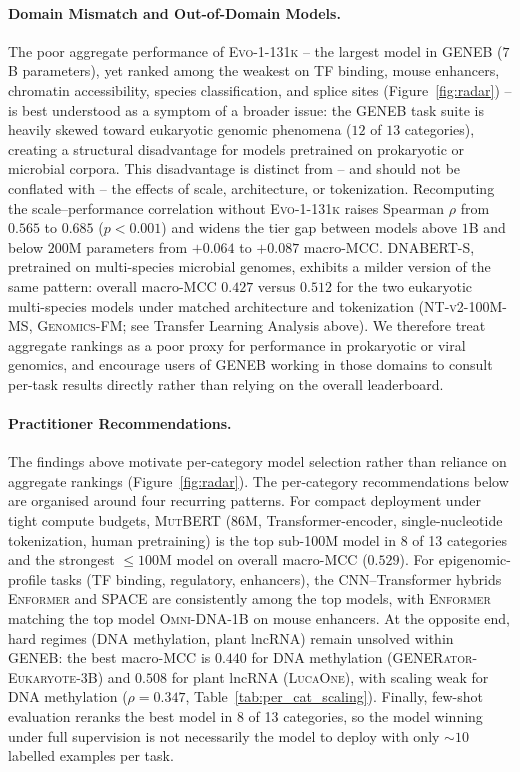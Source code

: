 \documentclass{article}
\theoremstyle{plain}
\theoremstyle{definition}
\theoremstyle{remark}
\begin{document}
\paragraph{Domain Mismatch and Out-of-Domain Models.}
The poor aggregate performance of \textsc{Evo-1-131k} -- the largest
model in GENEB ($7$B parameters), yet ranked among the weakest on TF binding, mouse enhancers,
chromatin accessibility, species classification, and splice sites
(Figure~\ref{fig:radar}) -- is best understood as a symptom of a broader issue: the GENEB task suite is heavily skewed toward eukaryotic genomic phenomena
($12$ of $13$ categories), creating a structural disadvantage for
models pretrained on prokaryotic or microbial corpora. This disadvantage is distinct from -- and should
not be conflated with -- the effects of scale, architecture, or
tokenization. Recomputing the scale--performance correlation without \textsc{Evo-1-131k}
raises Spearman $\rho$ from $0.565$ to $0.685$ ($p<0.001$) and widens
the tier gap between models above $1$B and below $200$M parameters
from $+0.064$ to $+0.087$ macro-MCC.
\textsc{DNABERT-S}, pretrained on multi-species microbial genomes,
exhibits a milder version of the same pattern: overall macro-MCC
$0.427$ versus $0.512$ for the two eukaryotic multi-species models
under matched architecture and tokenization
(\textsc{NT-v2-100M-MS}, \textsc{Genomics-FM}; see Transfer Learning
Analysis above). We therefore treat aggregate rankings as a poor
proxy for performance in prokaryotic or viral genomics, and
encourage users of GENEB working in those domains to consult
per-task results directly rather than relying on the overall
leaderboard.

\paragraph{Practitioner Recommendations.}
The findings above motivate per-category model selection rather than
reliance on aggregate rankings (Figure~\ref{fig:radar}). The
per-category recommendations below are organised around four
recurring patterns. For compact deployment under tight compute
budgets, \textsc{MutBERT} (86M, Transformer-encoder, single-nucleotide
tokenization, human pretraining) is the top sub-100M model in 8 of 13
categories and the strongest $\le 100$M model on overall macro-MCC
($0.529$). For epigenomic-profile tasks (TF binding, regulatory,
enhancers), the CNN--Transformer hybrids \textsc{Enformer} and
\textsc{SPACE} are consistently among the top models, with
\textsc{Enformer} matching the top model \textsc{Omni-DNA-1B}
on mouse enhancers. At the opposite end, hard
regimes (DNA methylation, plant lncRNA) remain unsolved within GENEB:
the best macro-MCC is $0.440$ for DNA methylation
(\textsc{GENERator-Eukaryote-3B}) and $0.508$ for plant lncRNA
(\textsc{LucaOne}), with scaling weak for DNA methylation ($\rho=0.347$,
Table~\ref{tab:per_cat_scaling}). Finally, few-shot evaluation
reranks the best model in 8 of 13 categories, so the model winning
under full supervision is not necessarily the model to deploy with
only $\sim 10$ labelled examples per task.
\end{document}
